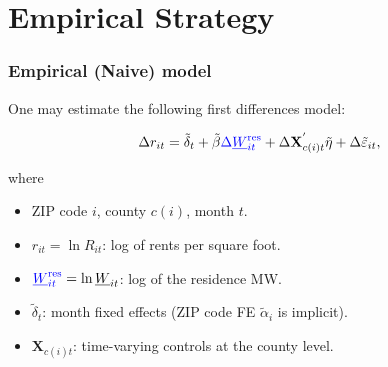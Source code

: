 \documentclass[aspectratio=169, t]{beamer}
\newcommand{\MW}{\underline{W}}
\begin{document}
\section{Empirical Strategy}

\begin{frame}[label = stat_only_model]
    \frametitle{Empirical (Naive) model}
    
    One may estimate the following first differences model:
    
    $$
    \Delta r_{it} = \tilde\delta_t + 
    \tilde\beta {\color{blue} \Delta \MW^{\text{res}}_{it}} + 
    \Delta \mathbf{X}^{'}_{c(i)t} \tilde\eta + 
    \Delta \tilde\varepsilon_{it} ,
    $$
    
    where    
    \begin{itemize} \small
    \item ZIP code $i$, county $c(i)$, month $t$.
    
    \item \vspace{1mm} $r_{it} = \ln R_{it}$: log of rents per square foot.
    
    \item \vspace{1mm} ${\color{blue} \MW^{\text{res}}_{it}} = \ln \MW_{it}$: log of the residence MW.
    
    \item \vspace{1mm} $\tilde\delta_t$: month fixed effects (ZIP code FE $\tilde\alpha_i 
    $ is 
    implicit).
    
    \item \vspace{.5mm} $\mathbf{X}_{c(i)t}$: time-varying controls at the county level.
    \end{itemize}
\end{frame}
\end{document}
